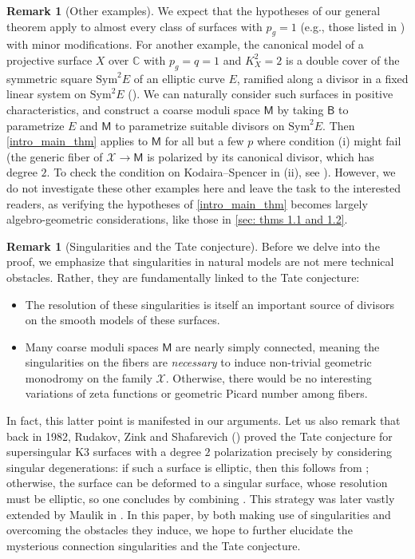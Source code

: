 \documentclass[11pt, letterpaper]{amsart}
\theoremstyle{plain}
\theoremstyle{definition}
\newtheorem{remark}[theorem]{Remark}
\newcommand{\IC}{\mathbb{C}}
\newcommand{\<}{\langle}
\renewcommand{\>}{\rangle}
\newcommand{\sfM}{\mathsf{M}}
\newcommand{\sX}{\mathcal{X}}
\newcommand{\sfB}{\mathsf{B}}
\begin{document}
\begin{remark}[Other examples]
    We expect that the hypotheses of our general theorem apply to almost every class of surfaces with $p_g = 1$ (e.g., those listed in \cite[Thm.~9.4]{Moonen}) with minor modifications. 
    For another example, the canonical model of a projective surface $X$ over $\IC$ with $p_g = q = 1$ and $K_X^2 = 2$ is a double cover of the symmetric square $\mathrm{Sym}^2 E$ of an elliptic curve $E$, ramified along a divisor in a fixed linear system on $\mathrm{Sym}^2 E$ (\cite[Prop.~20]{Catanese3}). We can naturally consider such surfaces in positive characteristics, and construct a coarse moduli space $\sfM$ by taking $\sfB$ to parametrize $E$ and $\sfM$ to parametrize suitable divisors on $\mathrm{Sym}^2 E$. 
    Then \cref{intro_main_thm} applies to $\sfM$ for all but a few $p$ where condition (i) might fail (the generic fiber of $\sX \to \sfM$ is polarized by its canonical divisor, which has degree $2$. To check the condition on Kodaira--Spencer in (ii), see \cite[p.283]{Catanese3}).
However, we do not investigate these other examples here and leave the task to the interested readers, as verifying the hypotheses of \cref{intro_main_thm} becomes largely algebro-geometric considerations, like those in \cref{sec: thms 1.1 and 1.2}. 
\end{remark}

\begin{remark}[Singularities and the Tate conjecture]
\label{rmk: singularities and Tate} Before we delve into the proof, we emphasize that singularities in natural models are not mere technical obstacles.
    Rather, they are fundamentally linked to the Tate conjecture: 
    \begin{itemize}
        \item The resolution of these singularities is itself an important source of divisors on the smooth models of these surfaces. 
        \item Many coarse moduli spaces $\sfM$ are nearly simply connected, meaning the singularities on the fibers are \emph{necessary} to induce non-trivial geometric monodromy on the family $\sX$.
    Otherwise, there would be no interesting variations of zeta functions or geometric Picard number among fibers. 
    \end{itemize}
    In fact, this latter point is manifested in our arguments. 
    Let us also remark that back in 1982, Rudakov, Zink and Shafarevich (\cite{RZS}) proved the Tate conjecture for supersingular K3 surfaces with a degree $2$ polarization precisely by considering singular degenerations: if such a surface is elliptic, then this follows from \cite{ASD}; otherwise, the surface can be deformed to a singular surface, whose resolution must be elliptic, so one concludes by combining \cite{ArtinSS}.  
    This strategy was later vastly extended by Maulik in \cite{Maulik}. 
    In this paper, by both making use of singularities and overcoming the obstacles they induce, we hope to further elucidate the mysterious connection singularities and the Tate conjecture. 
\end{remark}
\end{document}
